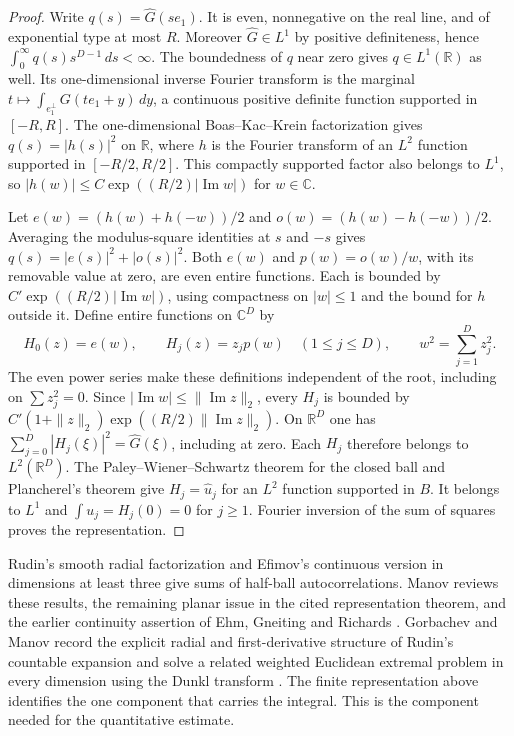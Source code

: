 \documentclass[11pt,a4paper]{article}
\numberwithin{equation}{section}
\begin{document}
\begin{proof}
Write $q(s)=\widehat G(se_1)$. It is even, nonnegative on the real line,
and of exponential type at most $R$. Moreover $\widehat G\in L^1$ by
positive definiteness, hence $\int_0^\infty q(s)s^{D-1}\,ds<\infty$.
The boundedness of $q$ near zero gives $q\in L^1(\mathbb R)$ as well.
Its one-dimensional inverse Fourier transform is the marginal
$t\mapsto\int_{e_1^\perp}G(te_1+y)\,dy$, a continuous positive definite
function supported in $[-R,R]$. The one-dimensional Boas--Kac--Krein
factorization \cite[Theorem~2.1]{EGR} gives $q(s)=|h(s)|^2$ on
$\mathbb R$, where $h$ is the Fourier transform of an $L^2$ function
supported in $[-R/2,R/2]$. This compactly supported factor also belongs to $L^1$, so
$|h(w)|\le C\exp((R/2)|\operatorname{Im}w|)$ for $w\in\mathbb C$.

Let $e(w)=(h(w)+h(-w))/2$ and $o(w)=(h(w)-h(-w))/2$. Averaging the
modulus-square identities at $s$ and $-s$ gives
$q(s)=|e(s)|^2+|o(s)|^2$. Both $e(w)$ and $p(w)=o(w)/w$, with its
removable value at zero, are even entire functions. Each is bounded by
$C'\exp((R/2)|\operatorname{Im}w|)$, using compactness on $|w|\le1$
and the bound for $h$ outside it. Define entire functions on $\mathbb C^D$
by
\[
 H_0(z)=e(w),\qquad H_j(z)=z_jp(w)\quad(1\le j\le D),
 \qquad w^2=\sum_{j=1}^D z_j^2.
\]
The even power series make these definitions independent of the root,
including on $\sum z_j^2=0$. Since
$|\operatorname{Im}w|\le\|\operatorname{Im}z\|_2$, every $H_j$ is
bounded by $C'(1+\|z\|_2)\exp((R/2)\|\operatorname{Im}z\|_2)$.
On $\mathbb R^D$ one has $\sum_{j=0}^D|H_j(\xi)|^2=\widehat G(\xi)$,
including at zero. Each $H_j$ therefore belongs to $L^2(\mathbb R^D)$.
The Paley--Wiener--Schwartz theorem for the closed ball and Plancherel's
theorem give $H_j=\widehat u_j$ for an $L^2$ function supported in $B$.
It belongs to $L^1$ and $\int u_j=H_j(0)=0$ for $j\ge1$.
Fourier inversion of the sum of squares proves the representation.
\end{proof}

Rudin's smooth radial factorization and Efimov's continuous version in
dimensions at least three give sums of half-ball autocorrelations.
Manov reviews these results, the remaining planar issue in the cited
representation theorem, and the earlier continuity assertion of Ehm,
Gneiting and Richards \cite[Theorem~5 and Remark~3]{Manov}.
Gorbachev and Manov record the explicit radial and first-derivative
structure of Rudin's countable expansion and solve a related weighted
Euclidean extremal problem in every dimension using the Dunkl transform
\cite[Theorem~4 and Remark~7]{GM}. The finite representation above
identifies the one component that carries the integral. This is the
component needed for the quantitative estimate.
\end{document}
